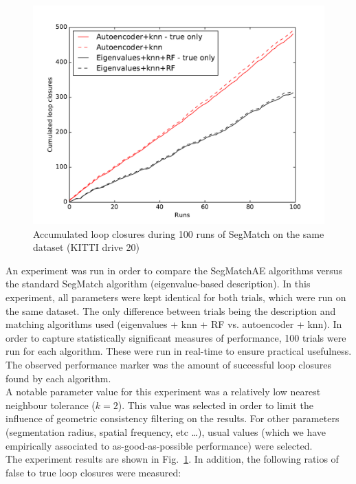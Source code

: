 \begin{figure}
  \centering
  \includegraphics[width=5.2in]{images/kitti20performance.pdf}
  \caption{Accumulated loop closures during 100 runs of SegMatch on the same dataset (KITTI drive 20)}
  \label{fig:kitti20-performance}
\end{figure}

An experiment was run in order to compare the SegMatchAE algorithms versus the standard SegMatch algorithm (eigenvalue-based description). In this experiment, all parameters were kept identical for both trials, which were run on the same dataset. The only difference between trials being the description and matching algorithms used (eigenvalues + knn + RF vs. autoencoder + knn). In order to capture statistically significant measures of performance, 100 trials were run for each algorithm. These were run in real-time to ensure practical usefulness. The observed performance marker was the amount of successful loop closures found by each algorithm.\\ 

A notable parameter value for this experiment was a relatively low nearest neighbour tolerance ($k=2$). This value was selected in order to limit the influence of geometric consistency filtering on the results. For other parameters (segmentation radius, spatial frequency, etc \ldots), usual values (which we have empirically associated to as-good-as-possible performance) were selected.\\

The experiment results are shown in Fig.~\ref{fig:kitti20-performance}. In addition, the following ratios of false to true loop closures were measured:\\

